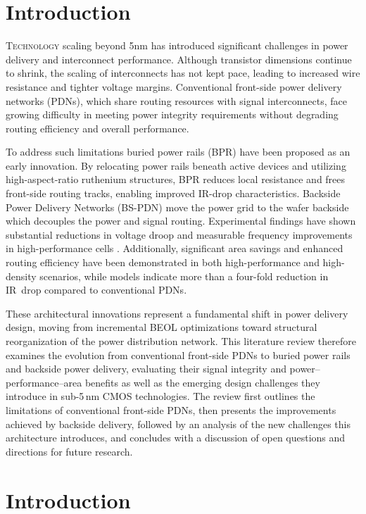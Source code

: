 \section{Introduction}

\lettrine{T}{echnology} scaling beyond 5nm has introduced significant challenges in power delivery and interconnect performance. Although transistor dimensions continue to shrink, the scaling of interconnects has not kept pace, leading to increased wire resistance and tighter voltage margins. Conventional front-side power delivery networks (PDNs), which share routing resources with signal interconnects, face growing difficulty in meeting power integrity requirements without degrading routing efficiency and overall performance\cite{8993617}.

To address such limitations buried power rails (BPR) have been proposed as an early innovation. By relocating power rails beneath active devices and utilizing high-aspect-ratio ruthenium structures, BPR reduces local resistance and frees front-side routing tracks, enabling improved IR-drop characteristics\cite{8993617}. Backside Power Delivery Networks (BS-PDN) move the power grid to the wafer backside which decouples the power and signal routing\cite{10185208}. Experimental findings have shown substantial reductions in voltage droop and measurable frequency improvements in high-performance cells \cite{10185208}. Additionally, significant area savings and enhanced routing efficiency have been demonstrated in both high-performance and high-density scenarios\cite{10631463}, while models indicate more than a four-fold reduction in IR~drop compared to conventional PDNs\cite{8932458}.

These architectural innovations represent a fundamental shift in power delivery design, moving from incremental BEOL optimizations toward structural reorganization of the power distribution network. This literature review therefore examines the evolution from conventional front-side PDNs to buried power rails and backside power delivery, evaluating their signal integrity and power--performance--area benefits as well as the emerging design challenges they introduce in sub-5\,nm CMOS technologies. The review first outlines the limitations of conventional front-side PDNs, then presents the improvements achieved by backside delivery, followed by an analysis of the new challenges this architecture introduces, and concludes with a discussion of open questions and directions for future research.\section{Introduction}

